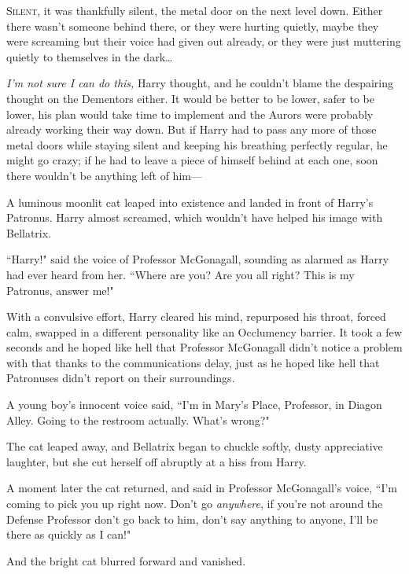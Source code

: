 
\lettrine{S}{ilent}, it was thankfully silent, the metal door on the next level down. Either there wasn't someone behind there, or they were hurting quietly, maybe they were screaming but their voice had given out already, or they were just muttering quietly to themselves in the dark{\ldots}

\emph{I'm not sure I can do this,} Harry thought, and he couldn't blame the despairing thought on the Dementors either. It would be better to be lower, safer to be lower, his plan would take time to implement and the Aurors were probably already working their way down. But if Harry had to pass any more of those metal doors while staying silent and keeping his breathing perfectly regular, he might go crazy; if he had to leave a piece of himself behind at each one, soon there wouldn't be anything left of him---

A luminous moonlit cat leaped into existence and landed in front of Harry's Patronus. Harry almost screamed, which wouldn't have helped his image with Bellatrix.

``Harry!" said the voice of Professor McGonagall, sounding as alarmed as Harry had ever heard from her. ``Where are you? Are you all right? This is my Patronus, answer me!"

With a convulsive effort, Harry cleared his mind, repurposed his throat, forced calm, swapped in a different personality like an Occlumency barrier. It took a few seconds and he hoped like hell that Professor McGonagall didn't notice a problem with that thanks to the communications delay, just as he hoped like hell that Patronuses didn't report on their surroundings.

A young boy's innocent voice said, ``I'm in Mary's Place, Professor, in Diagon Alley. Going to the restroom actually. What's wrong?"

The cat leaped away, and Bellatrix began to chuckle softly, dusty appreciative laughter, but she cut herself off abruptly at a hiss from Harry.

A moment later the cat returned, and said in Professor McGonagall's voice, ``I'm coming to pick you up right now. Don't go \emph{anywhere}, if you're not around the Defense Professor don't go back to him, don't say anything to anyone, I'll be there as quickly as I can!"

And the bright cat blurred forward and vanished.

